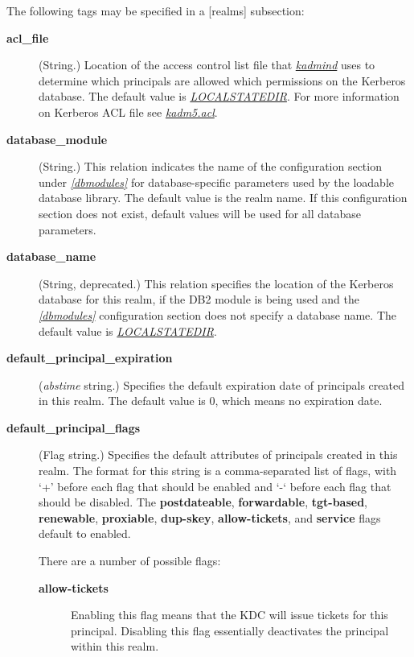 \documentclass[letterpaper,10pt,english]{sphinxmanual}
\begin{document}
The following tags may be specified in a {[}realms{]} subsection:
\begin{description}
\item[{\textbf{acl\_file}}] \leavevmode
(String.)  Location of the access control list file that
{\hyperref[admin/admin_commands/kadmind:kadmind-8]{\emph{kadmind}}} uses to determine which principals are allowed
which permissions on the Kerberos database.  The default value is
{\hyperref[mitK5defaults:paths]{\emph{LOCALSTATEDIR}}}.  For more information on Kerberos ACL
file see {\hyperref[admin/conf_files/kadm5_acl:kadm5-acl-5]{\emph{kadm5.acl}}}.

\item[{\textbf{database\_module}}] \leavevmode
(String.)  This relation indicates the name of the configuration
section under {\hyperref[admin/conf_files/kdc_conf:dbmodules]{\emph{{[}dbmodules{]}}}} for database-specific parameters
used by the loadable database library.  The default value is the
realm name.  If this configuration section does not exist, default
values will be used for all database parameters.

\item[{\textbf{database\_name}}] \leavevmode
(String, deprecated.)  This relation specifies the location of the
Kerberos database for this realm, if the DB2 module is being used
and the {\hyperref[admin/conf_files/kdc_conf:dbmodules]{\emph{{[}dbmodules{]}}}} configuration section does not specify a
database name.  The default value is {\hyperref[mitK5defaults:paths]{\emph{LOCALSTATEDIR}}}.

\item[{\textbf{default\_principal\_expiration}}] \leavevmode
(\emph{abstime} string.)  Specifies the default expiration date of
principals created in this realm.  The default value is 0, which
means no expiration date.

\item[{\textbf{default\_principal\_flags}}] \leavevmode
(Flag string.)  Specifies the default attributes of principals
created in this realm.  The format for this string is a
comma-separated list of flags, with `+' before each flag that
should be enabled and `-` before each flag that should be
disabled.  The \textbf{postdateable}, \textbf{forwardable}, \textbf{tgt-based},
\textbf{renewable}, \textbf{proxiable}, \textbf{dup-skey}, \textbf{allow-tickets}, and
\textbf{service} flags default to enabled.

There are a number of possible flags:
\begin{description}
\item[{\textbf{allow-tickets}}] \leavevmode
Enabling this flag means that the KDC will issue tickets for
this principal.  Disabling this flag essentially deactivates
the principal within this realm.


\end{description}
\end{description}
\end{document}
